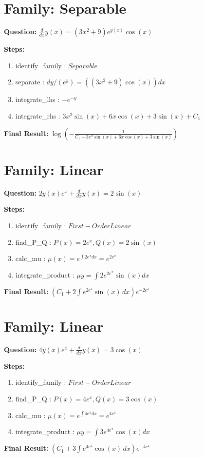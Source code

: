 \documentclass{article}
\begin{document}
\section*{Family: Separable}
\textbf{Question:} $\frac{d}{d x} y{\left(x \right)} = \left(3 x^{2} + 9\right) e^{y{\left(x \right)}} \cos{\left(x \right)}$

\textbf{Steps:}
\begin{enumerate}
\item identify_family :  $Separable$
\item separate :  $dy / (e^{y}) = (\left(3 x^{2} + 9\right) \cos{\left(x \right)}) dx$
\item integrate_lhs :  $- e^{- y}$
\item integrate_rhs :  $3 x^{2} \sin{\left(x \right)} + 6 x \cos{\left(x \right)} + 3 \sin{\left(x \right)} + C_1$
\end{enumerate}
\textbf{Final Result:} $\log{\left(- \frac{1}{C_{1} + 3 x^{2} \sin{\left(x \right)} + 6 x \cos{\left(x \right)} + 3 \sin{\left(x \right)}} \right)}$

\section*{Family: Linear}
\textbf{Question:} $2 y{\left(x \right)} e^{x} + \frac{d}{d x} y{\left(x \right)} = 2 \sin{\left(x \right)}$

\textbf{Steps:}
\begin{enumerate}
\item identify_family :  $First-Order Linear$
\item find_P_Q :  $P(x)=2 e^{x}, Q(x)=2 \sin{\left(x \right)}$
\item calc_mu :  $\mu(x) = e^{\int 2 e^{x} dx} = e^{2 e^{x}}$
\item integrate_product :  $\mu y = \int 2 e^{2 e^{x}} \sin{\left(x \right)} dx$
\end{enumerate}
\textbf{Final Result:} $\left(C_{1} + 2 \int e^{2 e^{x}} \sin{\left(x \right)}\, dx\right) e^{- 2 e^{x}}$

\section*{Family: Linear}
\textbf{Question:} $4 y{\left(x \right)} e^{x} + \frac{d}{d x} y{\left(x \right)} = 3 \cos{\left(x \right)}$

\textbf{Steps:}
\begin{enumerate}
\item identify_family :  $First-Order Linear$
\item find_P_Q :  $P(x)=4 e^{x}, Q(x)=3 \cos{\left(x \right)}$
\item calc_mu :  $\mu(x) = e^{\int 4 e^{x} dx} = e^{4 e^{x}}$
\item integrate_product :  $\mu y = \int 3 e^{4 e^{x}} \cos{\left(x \right)} dx$
\end{enumerate}
\textbf{Final Result:} $\left(C_{1} + 3 \int e^{4 e^{x}} \cos{\left(x \right)}\, dx\right) e^{- 4 e^{x}}$
\end{document}
